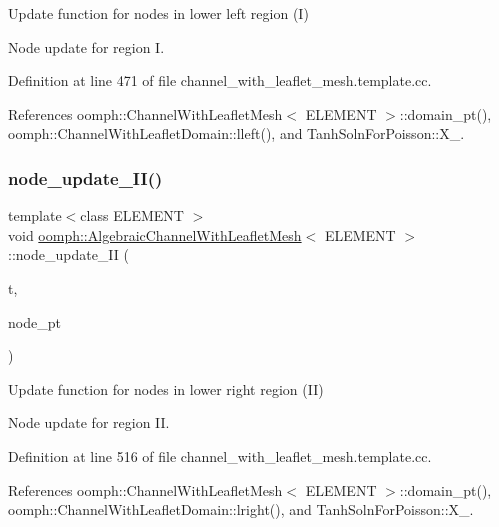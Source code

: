 Update function for nodes in lower left region (I) 

Node update for region I. 

Definition at line 471 of file channel\+\_\+with\+\_\+leaflet\+\_\+mesh.\+template.\+cc.



References oomph\+::\+Channel\+With\+Leaflet\+Mesh$<$ E\+L\+E\+M\+E\+N\+T $>$\+::domain\+\_\+pt(), oomph\+::\+Channel\+With\+Leaflet\+Domain\+::lleft(), and Tanh\+Soln\+For\+Poisson\+::\+X\+\_.

\mbox{\label{classoomph_1_1AlgebraicChannelWithLeafletMesh_aafaeee96d0e7602cc990229abbd9c8fd}} 
\subsubsection{\texorpdfstring{node\+\_\+update\+\_\+\+I\+I()}{node\_update\_II()}}
{\footnotesize\ttfamily template$<$class E\+L\+E\+M\+E\+NT $>$ \\
void \hyperlink{classoomph_1_1AlgebraicChannelWithLeafletMesh}{oomph\+::\+Algebraic\+Channel\+With\+Leaflet\+Mesh}$<$ E\+L\+E\+M\+E\+NT $>$\+::node\+\_\+update\+\_\+\+II (\begin{DoxyParamCaption}\item[{const unsigned \&}]{t,  }\item[{Algebraic\+Node $\ast$\&}]{node\+\_\+pt }\end{DoxyParamCaption})\hspace{0.3cm}{\ttfamily [protected]}}



Update function for nodes in lower right region (II) 

Node update for region II. 

Definition at line 516 of file channel\+\_\+with\+\_\+leaflet\+\_\+mesh.\+template.\+cc.



References oomph\+::\+Channel\+With\+Leaflet\+Mesh$<$ E\+L\+E\+M\+E\+N\+T $>$\+::domain\+\_\+pt(), oomph\+::\+Channel\+With\+Leaflet\+Domain\+::lright(), and Tanh\+Soln\+For\+Poisson\+::\+X\+\_.

